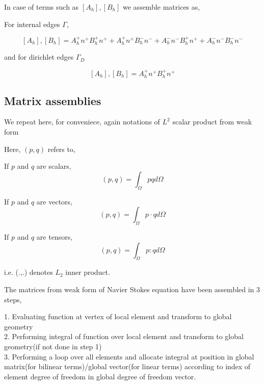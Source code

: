 \documentclass[a4paper,12pt]{book}
\begin{document}
In case of terms such as $[A_h],[B_h]$ we assemble matrices as, 

For internal edges $\Gamma$,

\begin{equation} \label{Jump operator L2}
[A_h],[B_h] = A_h^+ n^+ B_h^+ n^+ + A_h^+ n^+ B_h^- n^- + A_h^- n^- B_h^+ n^+ + A_h^- n^- B_h^- n^-
\end{equation}

and for dirichlet edges $\Gamma_D$

\begin{equation} \label{Jump operator L2 for dirichlet}
[A_h],[B_h] = A_h^+ n^+ B_h^+ n^+ 
\end{equation}


\subsection{Matrix assemblies}

We repeat here, for conveniece, again notations of $L^2$ scalar product from weak form

Here, $(p,q)$ refers to,

If $p$ and $q$ are scalars,
\begin{equation}\label{inner product scalars}
(p,q)=\int_{\Omega} pq d \Omega 
\end{equation}

If $p$ and $q$ are vectors,
\begin{equation}\label{Inner product vectors}
(p,q)=\int_{\Omega} p \cdot q d\Omega
\end{equation}

If $p$ and $q$ are tensors,
\begin{equation}\label{Inner product tensors}
(p,q)=\int_{\Omega} p:q d\Omega
\end{equation}

i.e. (.,.) denotes $L_2$ inner product.

The matrices from weak form of Navier Stokes equation have been assembled in 3 steps,

1. Evaluating function at vertex of local element and transform to global geometry\\
2. Performing integral of function over local element and transform to global geometry(if not done in step 1)\\
3. Performing a loop over all elements and allocate integral at position in global matrix(for bilinear terms)/global vector(for linear terms) according to index of element degree of freedom in global degree of freedom vector.
\end{document}
